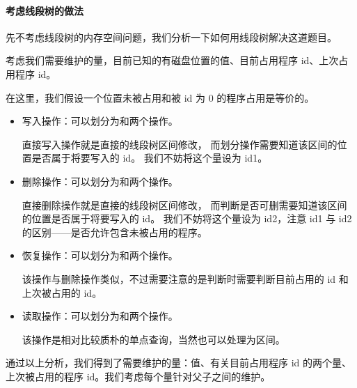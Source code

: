\paragraph{考虑线段树的做法}

先不考虑线段树的内存空间问题，我们分析一下如何用线段树解决这道题目。

考虑我们需要维护的量，目前已知的有磁盘位置的值、目前占用程序 id、上次占用程序 id。

在这里，我们假设一个位置未被占用和被 id 为 0 的程序占用是等价的。

\begin{itemize}
  \item 写入操作：可以划分为{}和{}两个操作。

        直接写入操作就是直接的线段树区间修改，
        而划分操作需要知道该区间{}的位置是否属于将要写入的 id。
        我们不妨将这个量设为 id1。

  \item 删除操作：可以划分为{}和{}两个操作。

        直接删除操作就是直接的线段树区间修改，
        而判断是否可删需要知道该区间{}的位置是否属于将要写入的 id。
        我们不妨将这个量设为 id2，注意 id1 与 id2 的区别——是否允许包含未被占用的程序。

  \item 恢复操作：可以划分为{}和{}两个操作。

        该操作与删除操作类似，不过需要注意的是判断时需要判断目前占用的 id 和上次被占用的 id。

  \item 读取操作：可以划分为{}和{}两个操作。

        该操作是相对比较质朴的单点查询，当然也可以处理为区间。

\end{itemize}

通过以上分析，我们得到了需要维护的量：值、有关目前占用程序 id 的两个量、上次被占用的程序 id。我们考虑每个量针对父子之间的维护。

